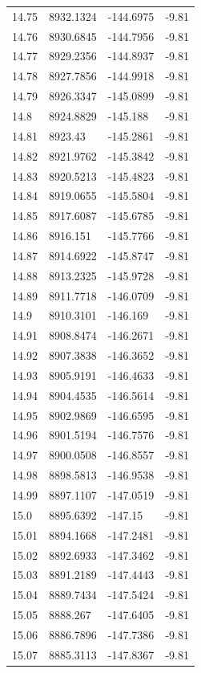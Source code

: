 \begin{table}[H]
\begin{tabular}{llll}
14.75 & 8932.1324 & -144.6975 & -9.81 \\
14.76 & 8930.6845 & -144.7956 & -9.81 \\
14.77 & 8929.2356 & -144.8937 & -9.81 \\
14.78 & 8927.7856 & -144.9918 & -9.81 \\
14.79 & 8926.3347 & -145.0899 & -9.81 \\
14.8 & 8924.8829 & -145.188 & -9.81 \\
14.81 & 8923.43 & -145.2861 & -9.81 \\
14.82 & 8921.9762 & -145.3842 & -9.81 \\
14.83 & 8920.5213 & -145.4823 & -9.81 \\
14.84 & 8919.0655 & -145.5804 & -9.81 \\
14.85 & 8917.6087 & -145.6785 & -9.81 \\
14.86 & 8916.151 & -145.7766 & -9.81 \\
14.87 & 8914.6922 & -145.8747 & -9.81 \\
14.88 & 8913.2325 & -145.9728 & -9.81 \\
14.89 & 8911.7718 & -146.0709 & -9.81 \\
14.9 & 8910.3101 & -146.169 & -9.81 \\
14.91 & 8908.8474 & -146.2671 & -9.81 \\
14.92 & 8907.3838 & -146.3652 & -9.81 \\
14.93 & 8905.9191 & -146.4633 & -9.81 \\
14.94 & 8904.4535 & -146.5614 & -9.81 \\
14.95 & 8902.9869 & -146.6595 & -9.81 \\
14.96 & 8901.5194 & -146.7576 & -9.81 \\
14.97 & 8900.0508 & -146.8557 & -9.81 \\
14.98 & 8898.5813 & -146.9538 & -9.81 \\
14.99 & 8897.1107 & -147.0519 & -9.81 \\
15.0 & 8895.6392 & -147.15 & -9.81 \\
15.01 & 8894.1668 & -147.2481 & -9.81 \\
15.02 & 8892.6933 & -147.3462 & -9.81 \\
15.03 & 8891.2189 & -147.4443 & -9.81 \\
15.04 & 8889.7434 & -147.5424 & -9.81 \\
15.05 & 8888.267 & -147.6405 & -9.81 \\
15.06 & 8886.7896 & -147.7386 & -9.81 \\
15.07 & 8885.3113 & -147.8367 & -9.81 \\

\end{tabular}
\end{table}
